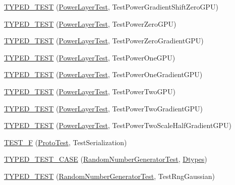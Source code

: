\begin{DoxyCompactItemize}
\item 
\hyperlink{namespacecaffe_a55b210d76fe6c95ac9cb2032ea1167ce}{T\+Y\+P\+E\+D\+\_\+\+T\+E\+S\+T} (\hyperlink{classcaffe_1_1_power_layer_test}{Power\+Layer\+Test}, Test\+Power\+Gradient\+Shift\+Zero\+G\+P\+U)
\item 
\hyperlink{namespacecaffe_a5eea49c2f8f10be2bdff28efd86fa965}{T\+Y\+P\+E\+D\+\_\+\+T\+E\+S\+T} (\hyperlink{classcaffe_1_1_power_layer_test}{Power\+Layer\+Test}, Test\+Power\+Zero\+G\+P\+U)
\item 
\hyperlink{namespacecaffe_a55eb1e52bff207d6db03c87351d850ff}{T\+Y\+P\+E\+D\+\_\+\+T\+E\+S\+T} (\hyperlink{classcaffe_1_1_power_layer_test}{Power\+Layer\+Test}, Test\+Power\+Zero\+Gradient\+G\+P\+U)
\item 
\hyperlink{namespacecaffe_a6f65f93ea66104aefccfc77cab8313e5}{T\+Y\+P\+E\+D\+\_\+\+T\+E\+S\+T} (\hyperlink{classcaffe_1_1_power_layer_test}{Power\+Layer\+Test}, Test\+Power\+One\+G\+P\+U)
\item 
\hyperlink{namespacecaffe_ae58b17bf9d1f0786093f9d6f4f626f00}{T\+Y\+P\+E\+D\+\_\+\+T\+E\+S\+T} (\hyperlink{classcaffe_1_1_power_layer_test}{Power\+Layer\+Test}, Test\+Power\+One\+Gradient\+G\+P\+U)
\item 
\hyperlink{namespacecaffe_af3b2f7643bd0eca86f4539a89d61fba2}{T\+Y\+P\+E\+D\+\_\+\+T\+E\+S\+T} (\hyperlink{classcaffe_1_1_power_layer_test}{Power\+Layer\+Test}, Test\+Power\+Two\+G\+P\+U)
\item 
\hyperlink{namespacecaffe_afad1acac0dd1070cceca1ff618b15a3c}{T\+Y\+P\+E\+D\+\_\+\+T\+E\+S\+T} (\hyperlink{classcaffe_1_1_power_layer_test}{Power\+Layer\+Test}, Test\+Power\+Two\+Gradient\+G\+P\+U)
\item 
\hyperlink{namespacecaffe_a7dd6856b44944588a098e4aaed16abbd}{T\+Y\+P\+E\+D\+\_\+\+T\+E\+S\+T} (\hyperlink{classcaffe_1_1_power_layer_test}{Power\+Layer\+Test}, Test\+Power\+Two\+Scale\+Half\+Gradient\+G\+P\+U)
\item 
\hyperlink{namespacecaffe_a56e24ba51341de0b5d3148cea18d7599}{T\+E\+S\+T\+\_\+\+F} (\hyperlink{classcaffe_1_1_proto_test}{Proto\+Test}, Test\+Serialization)
\item 
\hyperlink{namespacecaffe_a337efb6ddeb6d3bd5e213b611a438194}{T\+Y\+P\+E\+D\+\_\+\+T\+E\+S\+T\+\_\+\+C\+A\+S\+E} (\hyperlink{classcaffe_1_1_random_number_generator_test}{Random\+Number\+Generator\+Test}, \hyperlink{namespacecaffe_a131dc2be50f2f10e18450da61cde6b57}{Dtypes})
\item 
\hyperlink{namespacecaffe_a7582b16a07d2d730d02b06e49d1ff9af}{T\+Y\+P\+E\+D\+\_\+\+T\+E\+S\+T} (\hyperlink{classcaffe_1_1_random_number_generator_test}{Random\+Number\+Generator\+Test}, Test\+Rng\+Gaussian)

\end{DoxyCompactItemize}
